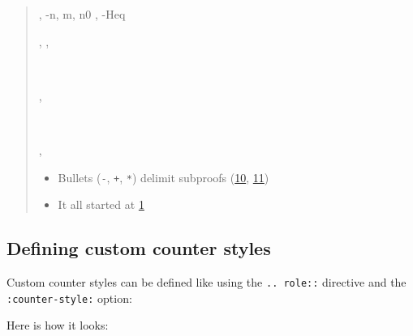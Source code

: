 \documentclass[a4paper]{article}
\begin{document}
\begin{quote}
\begin{alectryon}
\begin{sentence}
\begin{output}
\begin{goals}
\begin{goal}
\begin{hyps}
            \sep
            \hyp{n, m, n0}{}
            \sep
            \hyp{Heq}{~~~}
          \end{hyps}
          \sep
          \infrule{}
          \sep
          \begin{conclusion}
            ~~~~~~~~
          \end{conclusion}
        \end{goal}
      \end{goals}
    \end{output}
  \end{sentence}
  \sep
  \begin{sentence}
    \begin{input}
      ~~~~\nl
    \end{input}
  \end{sentence}
  \sep
  \begin{sentence}
    \begin{input}
    \end{input}
  \end{sentence}
\end{alectryon}

\begin{itemize}
\item Bullets (\texttt{-}, \texttt{+}, \texttt{*}) delimit subproofs (\hyperref[references-rst-io-setup-s-base-case-0]{10}, \hyperref[references-rst-induction-0]{11})

\item It all started at \hyperref[references-rst-fixpoint-plus-comm-0]{1}
\end{itemize}
\end{quote}


\subsection{Defining custom counter styles%
  \label{defining-custom-counter-styles}%
}

Custom counter styles can be defined like using the \texttt{.. role::} directive and the \texttt{:counter-style:} option:

Here is how it looks:
\end{document}
